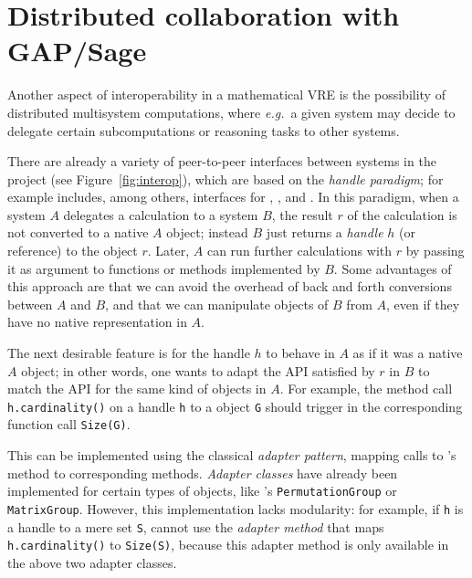 \section{Distributed collaboration with GAP/Sage}\label{sec:gapsage}
\label{sec:handles}

Another aspect of interoperability in a mathematical VRE is the possibility
of distributed multisystem computations, where \emph{e.g.}\ a given system
may decide to delegate certain subcomputations or reasoning tasks to other systems.

There are already a variety of peer-to-peer interfaces between systems
in the \ODK project (see Figure~\ref{fig:interop}), which are based on
the \emph{handle paradigm}; for example \Sage includes, among others,
interfaces for \GAP, \Singular, and \Pari.
%
In this paradigm, when a system $A$ delegates a calculation to a system $B$, the
result $r$ of the calculation is not converted to a native $A$ object; instead $B$ just
returns a \emph{handle} $h$ (or reference) to the object $r$. Later, $A$ can run further
calculations with $r$ by passing it as argument to functions or methods implemented by $B$.
Some advantages of this approach are that we can avoid the overhead of back and forth
conversions between $A$ and $B$, and that we can manipulate objects of $B$ from $A$, even
if they have no native representation in $A$.

The next desirable feature is for the handle $h$ to behave in $A$ as
if it was a native $A$ object; in other words, one wants to adapt the API
satisfied by $r$ in $B$ to match the API for the same kind of objects
in $A$. For example, the method call \texttt{h.cardinality()} on a
\Sage handle \texttt{h} to a \GAP object \texttt{G} should trigger in
\GAP the corresponding function call \texttt{Size(G)}.

This can be implemented using the classical \emph{adapter
  pattern}, mapping calls to \Sage's method to corresponding \GAP
methods. \emph{Adapter classes} have already been implemented for
certain types of objects, like \Sage's \texttt{PermutationGroup} or
\texttt{MatrixGroup}. However, this implementation lacks modularity:
for example, if \texttt{h} is a handle to a mere set \texttt{S}, \Sage
cannot use the \emph{adapter method} that maps
\texttt{h.cardinality()} to \texttt{Size(S)}, because this adapter
method is only available in the above two adapter classes.

